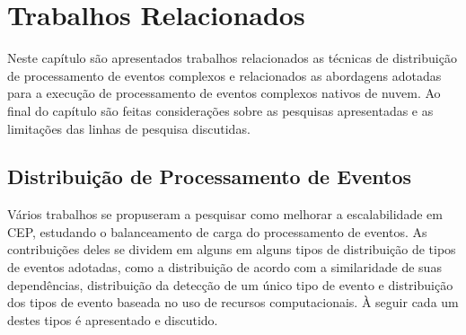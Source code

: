 \chapter{Trabalhos Relacionados}
\label{cap:trabalhos}



Neste capítulo são apresentados trabalhos relacionados as técnicas de distribuição de processamento de eventos complexos e relacionados as abordagens adotadas para a execução de processamento de eventos complexos nativos de nuvem. Ao final do capítulo são feitas considerações sobre as pesquisas apresentadas e as limitações das linhas de pesquisa discutidas.

\section{Distribuição de Processamento de Eventos}

Vários trabalhos se propuseram a pesquisar como melhorar a escalabilidade em CEP, estudando o balanceamento de carga do processamento de eventos. As contribuições deles se dividem em alguns em alguns tipos de distribuição de tipos de eventos adotadas, como a distribuição de acordo com a similaridade de suas dependências, distribuição da detecção de um único tipo de evento e distribuição dos tipos de evento baseada no uso de recursos computacionais. À seguir cada um destes tipos é apresentado e discutido.





